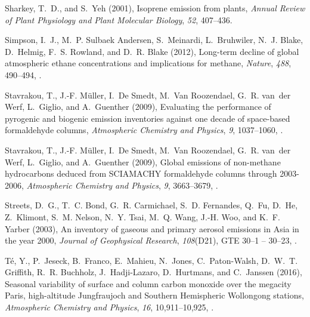 \documentclass[draft,linenumbers]{AGUJournal}
\begin{document}
\begin{thebibliography}{51}
Sharkey, T.~D., and S.~Yeh (2001), {Isoprene emission from plants},
  \textit{Annual Review of Plant Physiology and Plant Molecular Biology},
  \textit{52}, 407--436.

Simpson, I.~J., M.~P. {Sulbaek Andersen}, S.~Meinardi, L.~Bruhwiler, N.~J.
  Blake, D.~Helmig, F.~S. Rowland, and D.~R. Blake (2012), {Long-term decline
  of global atmospheric ethane concentrations and implications for methane},
  \textit{Nature}, \textit{488}, 490--494, .

Stavrakou, T., J.-F. M{\"{u}}ller, I.~{De Smedt}, M.~{Van Roozendael}, G.~R.
  van~der Werf, L.~Giglio, and A.~Guenther (2009{}), {Evaluating
  the performance of pyrogenic and biogenic emission inventories against one
  decade of space-based formaldehyde columns}, \textit{Atmospheric Chemistry
  and Physics}, \textit{9}, 1037--1060, .

Stavrakou, T., J.-F. M{\"{u}}ller, I.~{De Smedt}, M.~{Van Roozendael}, G.~R.
  van~der Werf, L.~Giglio, and A.~Guenther (2009{}), {Global
  emissions of non-methane hydrocarbons deduced from SCIAMACHY formaldehyde
  columns through 2003-2006}, \textit{Atmospheric Chemistry and Physics},
  \textit{9}, 3663--3679, .

Streets, D.~G., T.~C. Bond, G.~R. Carmichael, S.~D. Fernandes, Q.~Fu, D.~He,
  Z.~Klimont, S.~M. Nelson, N.~Y. Tsai, M.~Q. Wang, J.-H. Woo, and K.~F. Yarber
  (2003), {An inventory of gaseous and primary aerosol emissions in Asia in the
  year 2000}, \textit{Journal of Geophysical Research}, \textit{108}(D21), GTE
  30--1 -- 30--23, .

T{\'{e}}, Y., P.~Jeseck, B.~Franco, E.~Mahieu, N.~Jones, C.~Paton-Walsh,
  D.~W.~T. Griffith, R.~R. Buchholz, J.~Hadji-Lazaro, D.~Hurtmans, and
  C.~Janssen (2016), {Seasonal variability of surface and column carbon
  monoxide over the megacity Paris, high-altitude Jungfraujoch and Southern
  Hemispheric Wollongong stations}, \textit{Atmospheric Chemistry and Physics},
  \textit{16}, 10,911--10,925, .


\end{thebibliography}
\end{document}
